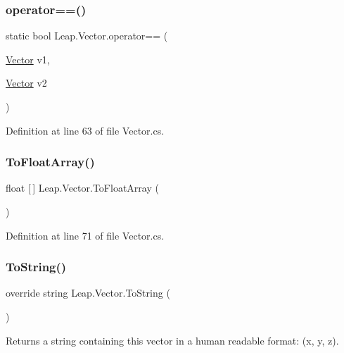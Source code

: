 \subsubsection{\texorpdfstring{operator==()}{operator==()}}
{\footnotesize\ttfamily static bool Leap.\+Vector.\+operator== (\begin{DoxyParamCaption}\item[{\mbox{\hyperlink{struct_leap_1_1_vector}{Vector}}}]{v1,  }\item[{\mbox{\hyperlink{struct_leap_1_1_vector}{Vector}}}]{v2 }\end{DoxyParamCaption})\hspace{0.3cm}{\ttfamily [static]}}



Definition at line 63 of file Vector.\+cs.

\mbox{\label{struct_leap_1_1_vector_ac5cd8263402ee3da54d342c65bde2511}} 
\subsubsection{\texorpdfstring{ToFloatArray()}{ToFloatArray()}}
{\footnotesize\ttfamily float \mbox{[}$\,$\mbox{]} Leap.\+Vector.\+To\+Float\+Array (\begin{DoxyParamCaption}{ }\end{DoxyParamCaption})}



Definition at line 71 of file Vector.\+cs.

\mbox{\label{struct_leap_1_1_vector_a0da414710f7b4d8bab10ed4685750599}} 
\subsubsection{\texorpdfstring{ToString()}{ToString()}}
{\footnotesize\ttfamily override string Leap.\+Vector.\+To\+String (\begin{DoxyParamCaption}{ }\end{DoxyParamCaption})}



Returns a string containing this vector in a human readable format\+: (x, y, z). 

